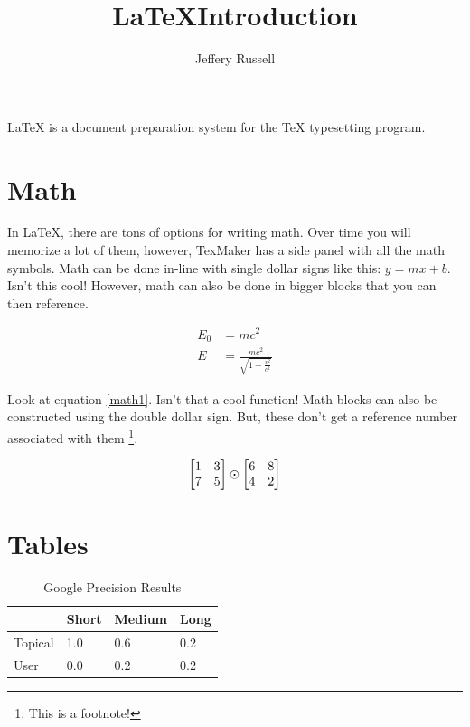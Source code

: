 \documentclass{article} %
\title{\LaTeX Introduction} %
\author{Jeffery Russell}
\begin{document}
  \maketitle %
  \LaTeX{} is a document preparation system for
  the \TeX{} typesetting program.

\section{Math}

	In \LaTeX, there are tons of options for writing math.
	Over time you will memorize a lot of them, however, TexMaker has a side panel with all the math symbols. Math can be done in-line with single dollar signs like this: $y = mx +b$. Isn't this cool! However, math can also be done in bigger blocks that you can then reference.

  \begin{align}
  	\label{math1}
    E_0 &= mc^2 \\
    E &= \frac{mc^2}{\sqrt{1-\frac{v^2}{c^2}}}
  \end{align} 
  
 Look at equation \ref{math1}. Isn't that a cool function! Math blocks can also be constructed using the double dollar sign. But, these don't get a reference number associated with them
\footnote{This is a footnote!}.
 
$$
\begin{bmatrix}
1 & 3\\
7 & 5
\end{bmatrix} \odot
\begin{bmatrix}
6 & 8\\
4 & 2
\end{bmatrix}\\*
$$


\section{Tables}




\begin{table}[h!]
\centering
\begin{tabular}{l|l|l|l}
 &  Short & Medium & Long \\ \hline
 Topical & 1.0  &  0.6 & 0.2  \\ \hline
 User & 0.0  & 0.2  & 0.2 
\end{tabular}
\caption{\label{tab:googlePerformance}Google Precision Results}
\end{table}
\end{document}
